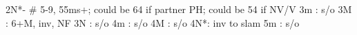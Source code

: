 2N*-  # 5-9, 55ms+; could be 64 if partner PH; could be 54 if NV/V
3m : s/o
3M : 6+M, inv, NF
3N : s/o
4m : s/o
4M : s/o
4N*: inv to slam
5m : s/o
